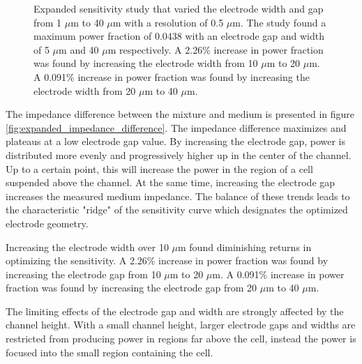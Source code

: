 \begin{figure}[h]
\begin{subfigure}[b]{0.49\textwidth}
    \end{subfigure}
    \caption[Expanded power fraction sensitivity study.]{Expanded sensitivity study that varied the electrode width and gap from 1 $\mu$m to 40 $\mu$m with a resolution of 0.5 $\mu$m. The study found a maximum power fraction of 0.0438 with an electrode gap and width of 5 $\mu$m  and 40 $\mu$m  respectively. A 2.26\% increase in power fraction was found by increasing the electrode width from 10 $\mu$m to 20 $\mu$m. A 0.091\% increase in power fraction was found by increasing the electrode width from 20 $\mu$m to 40 $\mu$m.}
    \label{fig:expanded_power_sensitivity} 
\end{figure}

\par The impedance difference between the mixture and medium is presented in figure \ref{fig:expanded_impedance_difference}. The impedance difference maximizes and plateaus at a low electrode gap value. By increasing the electrode gap, power is distributed more evenly and progressively higher up in the center of the channel. Up to a certain point, this will increase the power in the region of a cell suspended above the channel. At the same time, increasing the electrode gap increases the measured medium impedance. The balance of these trends leads to the characteristic "ridge" of the sensitivity curve which designates the optimized electrode geometry.

\par  Increasing the electrode width over 10 $\mu$m found diminishing returns in optimizing the sensitivity. A 2.26\% increase in power fraction was found by increasing the electrode gap from 10 $\mu$m to 20 $\mu$m. A 0.091\% increase in power fraction was found by increasing the electrode gap from 20 $\mu$m to 40 $\mu$m.

\par The limiting effects of the electrode gap and width are strongly affected by the channel height. With a small channel height, larger electrode gaps and widths are restricted from producing power in regions far above the cell, instead the power is focused into the small region containing the cell. 

